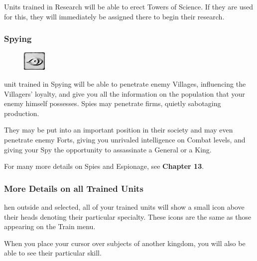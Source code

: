 Units trained in Research will be able to erect Towers of Science. If they are used for this, they will immediately be assigned there to begin their research.

\subsubsection{\textsf{Spying}}


\begin{figure}
    \vspace{-20pt}
    \begin{center}
        \includegraphics[width=0.1\textwidth]{Tspy}
    \end{center}
    \vspace{-20pt}
\end{figure}

 unit trained in Spying will be able to penetrate enemy Villages, influencing the Villagers’ loyalty, and give you all the information on the population that your enemy himself possesses. Spies may penetrate firms, quietly sabotaging production.


They may be put into an important position in their society and may even penetrate enemy Forts, giving you unrivaled intelligence on Combat levels, and giving your Spy the opportunity to assassinate a General or a King. 

For many more details on Spies and Espionage, see \textbf{Chapter 13}.

\subsubsection{\textsf{More Details on all Trained Units}}

hen outside and selected, all of your trained units will show a small icon above their heads denoting their particular specialty. These icons are the same as those appearing on the Train menu.

When you place your cursor over subjects of another kingdom, you will also be able to see their particular skill.

